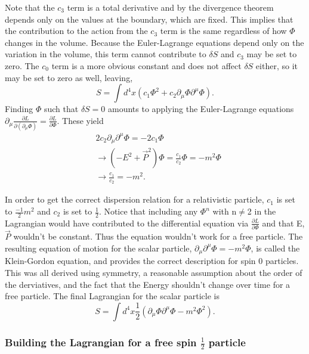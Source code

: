 Note that the $c_3$ term is a total derivative and by the divergence theorem depends only on the values at the boundary, which are fixed. This implies that the contribution to the action from the $c_3$ term is the same regardless of how $\Phi$ changes in the volume. Because the Euler-Lagrange equations depend only on the variation in the volume, this term cannot contribute to $\delta S$ and $c_3$ may be set to zero. The $c_0$ term is a more obvious constant and does not affect $\delta S$ either, so it may be set to zero as well, leaving,  
\begin{equation}
S = \int d^4x \left(c_1 \Phi^2 + c_2 \partial_\mu\Phi\partial^\mu\Phi\right).
\end{equation}
Finding $\Phi$ such that $\delta S = 0$ amounts to applying the Euler-Lagrange equations $\partial_\mu \frac{\partial L}{\partial\left(\partial_\mu\Phi\right)} = \frac{\partial L}{\partial \Phi}$. These yield 
\begin{equation}
\begin{split}
&2c_2\partial_\mu\partial^\mu\Phi = -2c_1\Phi \\ 
&\rightarrow (-E^2 + \vec{P}^2)\Phi = \frac{c_1}{c_2}\Phi = -m^2\Phi \\
&\rightarrow \frac{c_1}{c_2} = -m^2.
\end{split}
\end{equation}

In order to get the correct dispersion relation for a relativistic particle, $c_1$ is set to $\frac{-1}{2}m^2$ and $c_2$ is set to $\frac{1}{2}$. Notice that including any $\Phi^n$ with n$\neq$2 in the Lagrangian would have contributed to the differential equation via $\frac{\partial L}{\partial \Phi}$ and that E, $\vec{P}$ wouldn't be constant. Thus the equation wouldn't work for a free particle. The resulting equation of motion for the scalar particle, $\partial_\mu\partial^\mu\Phi = -m^2\Phi$, is called the Klein-Gordon equation, and provides the correct description for spin 0 particles. This was all derived using symmetry, a reasonable assumption about the order of the derviatives, and the fact that the Energy shouldn't change over time for a free particle. The final Lagrangian for the scalar particle is 
\begin{equation}
S = \int d^4x \frac{1}{2}\left(\partial_\mu\Phi\partial^\mu\Phi - m^2 \Phi^2 \right).
\end{equation}

\subsubsection{Building the Lagrangian for a free spin $\frac{1}{2}$ particle}

